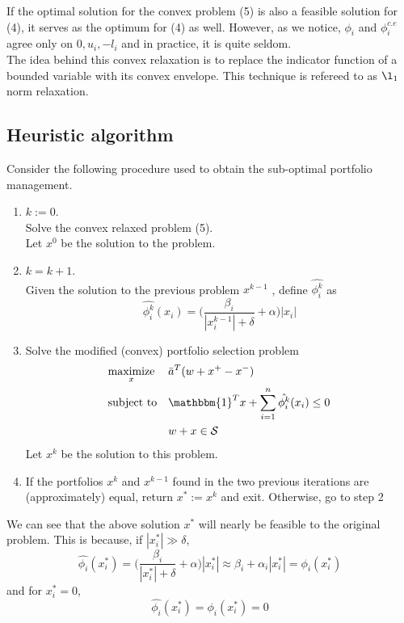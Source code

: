 \documentclass[a4paper]{article}
\begin{document}
If the optimal solution for the convex problem (5) is also a feasible solution for (4), it serves as the optimum for (4) as well. However, as we notice, $\phi_i$ and $\phi_i^{c.e}$ agree only on $0, u_i, -l_i$ and in practice, it is quite seldom.\\

The idea behind this convex relaxation is to replace the indicator function of a bounded variable with its convex envelope. This technique is refereed to as $\l_1$ norm relaxation.\cite{2}
\subsection{Heuristic algorithm}

Consider the following  procedure used to obtain the sub-optimal portfolio management.

\begin{enumerate}
\item
$k:=0.$\\
Solve the convex relaxed problem (5).\\
Let $x^0$ be the solution to the problem.\\
\item
$k=k+1$.\\
Given the solution to the previous problem $x^{k-1}$ , define $\hat{\phi_i^k}$ as
$$
\hat{\phi_i^k}(x_i)= \Big(\frac{\beta_i}{|x_i^{k-1}|+\delta}+ \alpha\Big) |x_i|
$$
\item
Solve the modified (convex) portfolio selection problem
\begin{equation}
\begin{aligned}
& \underset{x}{\text{maximize}}
& & \bar{a}^T (w+x^+ - x^-) \\
& \text{subject to}
& & \mathbbm{1}^Tx + \displaystyle \sum_{i=1}^n \hat{\phi_i^k}(x_i) \leq 0  \\
& & & w+x \in \mathcal{S}\\
\end{aligned}
\end{equation}
Let $x^k$ be the solution to this problem.
\item
If the portfolios $x^k$ and $x^{k-1}$ found in the two previous iterations are (approximately)
equal, return $ x^* := x^k $ and exit.
Otherwise, go to step 2
\end{enumerate}

We can see that the above solution $x^*$ will nearly be feasible to the original problem. This is because, if $|x_i^*| \gg \delta
$,
$$
\hat{\phi_i}(x_i^*)= \Big(\frac{\beta_i}{|x_i^{*}|+\delta}+ \alpha\Big) |x_i^*| \approx \beta_i + \alpha_i |x_i^*| = \phi_i(x_i^*)
$$
and for $x_i^*=0$,
$$
\hat{\phi_i}(x_i^*)=\phi_i(x_i^*)=0
$$
\\
\end{document}
